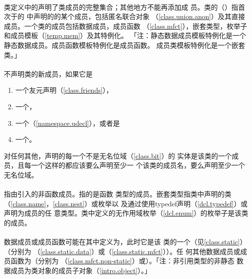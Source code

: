\paragraph{}
类定义中的声明了类成员的完整集合；其他地方不能再添加成
员。类的（）指首次于的
中声明的的某个成员，包括匿名联合对象
（\ref{class.union.anon}）及其直接成员。一个类的成员包括数据成员，成员函数
（\ref{class.mfct}），嵌套类型，枚举子和成员模板（\ref{temp.mem}）及其特例化。
「注：静态数据成员模板特例化是一个静态数据成员。成员函数模板特例化是成员函数。
成员类模板特例化是一个嵌套类。」

\paragraph{}
不声明类的新成员，如果它是
\begin{enumerate}
  \item{一个友元声明（\ref{class.friends}），}
  \item{一个，}
  \item{一个（\ref{namespace.udecl}），或者是}
  \item{一个。}
\end{enumerate}
对任何其他，声明的每一个不是无名位域（\ref{class.bit}）的
实体是该类的一个成员，且每一个这样的都应该要么声明至少一
个该类的成员名，要么声明至少一个无名位域。

\paragraph{}
指由引入的非函数成员。指的是函数
类型的成员。嵌套类型指类中声明的类（\ref{class.name}，\ref{class.nest}）或枚举以
及通过使用typedef声明（\ref{dcl.typedef}）或声明为成员的任
意类型。类中定义的无作用域枚举（\ref{dcl.enum}）的枚举子是该类的成员。

\paragraph{}
数据成员或成员函数可能在其中定义为，此时它是该
类的一个（见\ref{class.static}）（分别为
（\ref{class.static.data}）或（\ref{class.static.mfct}））。任
何其他数据成员或成员函数为（分别为
（\ref{class.mfct.non-static}）或）。「注：非引用类型的非静态
数据成员为类对象的成员子对象（\ref{intro.object}）。」

